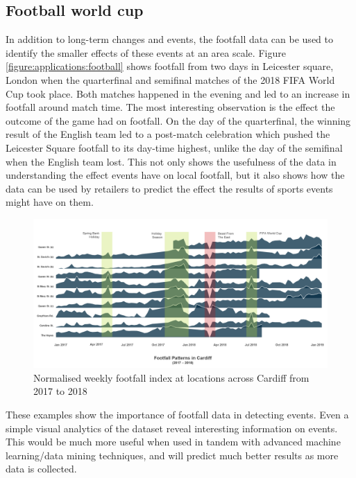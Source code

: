 \subsection{Football world cup}
In addition to long-term changes and events, the footfall data can be used to identify the smaller effects of these events at an area scale.
Figure \ref{figure:applications:football} shows footfall from two days in Leicester square, London when the quarterfinal and semifinal matches of the 2018 FIFA World Cup took place. Both matches happened in the evening and led to an  increase in footfall around match time. The most interesting observation is the effect the outcome of the game had on footfall. On the day of the quarterfinal, the winning result of the English team led to a post-match celebration which pushed the Leicester Square footfall to its day-time highest, unlike the day of the semifinal when the English team lost. This not only shows the usefulness of the data in understanding the effect events have on local footfall, but it also shows how the data can be used by retailers to predict the effect the results of sports events might have on them.

\begin{figure}
  \includegraphics[trim={0 50 0 0},clip]{images/applications-cardiff-footfall.png}
  \caption{Normalised weekly footfall index at locations across Cardiff from 2017 to 2018}
  \label{figure:applications:cardiff}
\end{figure}

These examples show the importance of footfall data in detecting events. Even a simple visual analytics of the dataset reveal interesting information on events. This would be much more useful when used in tandem with advanced machine learning/data mining techniques, and will predict much better results as more data is collected.

